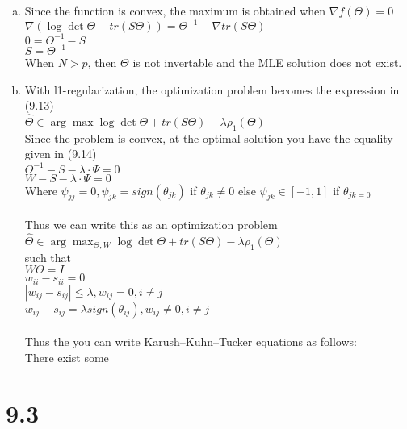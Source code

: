\documentclass[11pt]{article}
\begin{document}
\begin{enumerate}[(a)]
\item
Since the function is convex, the maximum is obtained when $\nabla f(\Theta) = 0$\\
$\nabla (\log \det \Theta - tr(S \Theta)) = \Theta^{-1} - \nabla tr(S \Theta)$\\
$0 = \Theta^{-1} - S$\\
$S = \Theta^{-1}$\\
When $N > p$, then $\Theta$ is not invertable and the MLE solution does not exist.

\item
With l1-regularization, the optimization problem becomes the expression in (9.13)\\
$\hat{\Theta} \in \arg \max \log \det \Theta + tr(S\Theta) - \lambda \rho_1 (\Theta)$\\
Since the problem is convex, at the optimal solution you have the equality given in (9.14)\\
$\Theta^{-1} - S - \lambda \cdot \Psi = 0$\\
$W - S - \lambda \cdot \Psi = 0$\\
Where $\psi_{jj} = 0, \psi_{jk} = sign(\theta_{jk})$ if $\theta_{jk} \neq 0$ else $\psi_{jk} \in [-1, 1]$ if $\theta_{jk = 0}$\\
\\
Thus we can write this as an optimization problem\\
$\hat{\Theta} \in \arg \max_{\Theta, W} \log \det \Theta + tr(S\Theta) - \lambda \rho_1 (\Theta)$\\
such that\\
$W \Theta = I$\\
$w_{ii} - s_{ii} = 0$\\
$|w_{ij} - s_{ij}| \leq \lambda, w_{ij} = 0, i \neq j$\\
$w_{ij} - s_{ij} = \lambda sign(\theta_{ij}), w_{ij} \neq 0, i \neq j$\\
\\
Thus the you can write Karush–Kuhn–Tucker equations as follows:\\
There exist some %
\\


\end{enumerate}

\newpage

\section*{9.3}
\end{document}
